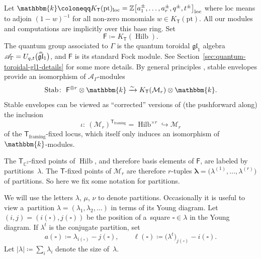 \documentclass[10pt,a4paper]{amsart}
\numberwithin{equation}{section}
\renewcommand{\hat}[1]{\widehat{#1}}
\newcommand{\hhat}[1]{\hat{\vphantom{\rule{1pt}{5.5pt}}\smash{\hat{#1}}}}
\renewcommand{\vec}[1]{\bm{#1}}
\newcommand{\lie}[1]{\mathfrak{#1}}
\newcommand{\bC}{\mathbb{C}}
\newcommand{\bZ}{\mathbb{Z}}
\newcommand{\bk}{\mathbbm{k}}
\newcommand{\cM}{\mathcal{M}}
\newcommand{\sF}{\mathsf{F}}
\newcommand{\sT}{\mathsf{T}}
\newcommand{\scA}{\mathscr{A}}
\newcommand{\pt}{\mathrm{pt}}
\newcommand{\loc}{\mathrm{loc}}
\DeclareMathOperator{\Hilb}{Hilb}
\DeclareMathOperator{\Stab}{Stab}
\begin{document}
\begin{MyParagraph}
Let
$\bk \coloneqq K_{\sT}(\pt)_{\loc} = \bZ\big[a_1^\pm, \ldots, a_r^\pm, q^\pm, t^\pm\big]_{\loc}$
where $\loc$ means to adjoin $(1-w)^{-1}$ for all non-zero monomials
$w \in K_{\sT}(\pt)$. All our modules and computations are implicitly
over this base ring. Set
\[ \sF \coloneqq K_\sT(\Hilb). \]
The quantum group associated to $\Gamma$ is the quantum toroidal
$\lie{gl}_1$ algebra $\scA_\Gamma = U_{q,t}\big(\hhat{\lie{gl}}_1\big)$, and $\sF$
is its standard Fock module. See
Section~\ref{sec:quantum-toroidal-gl1-details} for some more details. By
general principles \cite{Maulik2019}, stable envelopes provide an
isomorphism of $\scA_\Gamma$-modules
\begin{equation} \label{eq:k-theory-instanton-moduli}
 \Stab\colon \ \sF^{\otimes r} \otimes \bk \xrightarrow{\sim} K_\sT(\cM_r) \otimes \bk.
\end{equation}
Stable envelopes can be viewed as ``corrected'' versions of (the
pushforward along) the inclusion
\[ \iota\colon \ (\cM_r)^{\sT_{\text{framing}}} = \Hilb^{\times r} \hookrightarrow \cM_r \]
of the $\sT_{\text{framing}}$-fixed locus, which itself only induces
an isomorphism of $\bk$-modules.
\end{MyParagraph}

\begin{MyParagraph}
The $\sT_{\bC^2}$-fixed points of $\Hilb$, and therefore basis
elements of $\sF$, are labeled by partitions~$\lambda$. The
$\sT$-fixed points of $\cM_r$ are therefore $r$-tuples $\vec\lambda =
\big(\lambda^{(1)}, \ldots, \lambda^{(r)}\big)$ of partitions. So here we fix
some notation for partitions.

We will use the letters $\lambda$, $\mu$, $\nu$ to denote
partitions. Occasionally it is useful to view a~partition
$\lambda = (\lambda_1, \lambda_2, \ldots)$ in terms of its Young
diagram. Let $(i, j) = (i(\square), j(\square))$ be the position of a~square $\square \in \lambda$ in the Young diagram. If $\lambda^t$ is
the conjugate partition, set
\[ a(\square) \coloneqq \lambda_{i(\square)} - j(\square), \qquad \ell(\square) \coloneqq \big(\lambda^t\big)_{j(\square)} - i(\square). \]
Let $|\lambda| \coloneqq \sum_i \lambda_i$ denote the size of~$\lambda$.
\end{MyParagraph}
\end{document}
